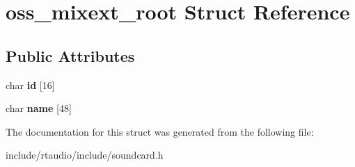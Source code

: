 \hypertarget{structoss__mixext__root}{}\section{oss\+\_\+mixext\+\_\+root Struct Reference}
\label{structoss__mixext__root}
\subsection*{Public Attributes}
\begin{DoxyCompactItemize}
\item 
char {\bfseries id} \mbox{[}16\mbox{]}\hypertarget{structoss__mixext__root_a167605748f8c3000f3730c3e07e50798}{}\label{structoss__mixext__root_a167605748f8c3000f3730c3e07e50798}

\item 
char {\bfseries name} \mbox{[}48\mbox{]}\hypertarget{structoss__mixext__root_a2f2e09e32a6edae7f19d89659b0568ce}{}\label{structoss__mixext__root_a2f2e09e32a6edae7f19d89659b0568ce}

\end{DoxyCompactItemize}


The documentation for this struct was generated from the following file\+:\begin{DoxyCompactItemize}
\item 
include/rtaudio/include/soundcard.\+h\end{DoxyCompactItemize}
